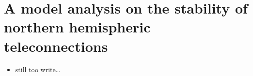 
\chapter{A model analysis on the stability of northern hemispheric teleconnections}

\label{chp:teles}



\begin{itemize}
	\item still too write\ldots
\end{itemize}
